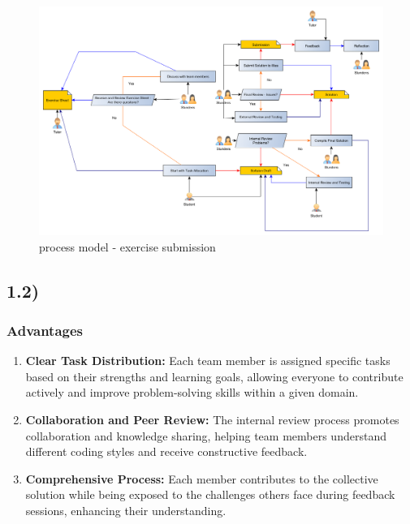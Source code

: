 \documentclass[a4paper]{scrartcl}
\begin{document}
\begin{figure}[h]
  \centering
  \includegraphics[width=1\textwidth]{ex2.png} %
  \caption{process model - exercise submission}
\end{figure}

\newpage

\subsection*{1.2)}

\subsubsection*{Advantages}
\begin{enumerate}
    \item \textbf{Clear Task Distribution:} Each team member is assigned specific tasks based on their strengths and learning goals, allowing everyone to contribute actively and improve problem-solving skills within a given domain.

    \item \textbf{Collaboration and Peer Review:} The internal review process promotes collaboration and knowledge sharing, helping team members understand different coding styles and receive constructive feedback.

    \item \textbf{Comprehensive Process:} Each member contributes to the collective solution while being exposed to the challenges others face during feedback sessions, enhancing their understanding.
\end{enumerate}
\end{document}
